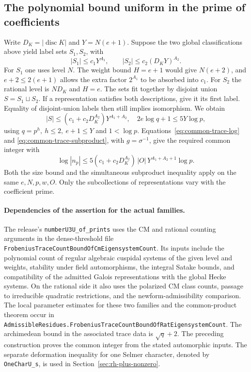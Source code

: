 \subsection{The polynomial bound uniform in the prime of coefficients}

Write \(D_K=|\operatorname{disc}K|\) and \(Y=N(e+1)\).
Suppose the two global classifications above yield label sets
\(S_1,S_2\), with
\[
             |S_1|\le c_1Y^{A_1},\qquad
             |S_2|\le c_2(D_KY)^{A_2}.
\]
For \(S_1\) one uses level \(N\). The weight bound \(H=e+1\)
would give \(N(e+2)\), and \(e+2\le2(e+1)\) allows the extra
factor \(2^{A_1}\) to be absorbed into \(c_1\).
For \(S_2\) the rational level is \(ND_K\) and \(H=e\).
The sets fit together by disjoint union \(S=S_1\sqcup S_2\).
If a representation satisfies both descriptions, give it its
first label. Equality of disjoint-union labels then still implies
isomorphism. We obtain
\[
 |S|\le(c_1+c_2D_K^{A_2})Y^{A_1+A_2},\quad
 2e\log q+1\le 5Y\log p ,
\]
using \(q=p^h,\ h\le2,\ e+1\le Y\) and \(1<\log p\).
Equations~\eqref{eq:common-trace-log} and
\eqref{eq:common-trace-subproduct}, with \(g=\sigma^{-1}\),
give the required common integer with
\[
 \log|n_p|\le 5(c_1+c_2D_K^{A_2})\,
                 |O|\,Y^{A_1+A_2+1}\log p .
\]
Both the size bound and the simultaneous subproduct inequality
apply on the same \(e,N,p,w,O\). Only the subcollections of
representations vary with the coefficient prime.

\paragraph{Dependencies of the assertion for the actual families.}
The release's \texttt{number\allowbreak{}U3\allowbreak{}U\_\allowbreak{}of\_\allowbreak{}prints} uses the CM
and rational counting arguments in the dense-threshold file
\texttt{Frobenius\allowbreak{}Trace\allowbreak{}Count\allowbreak{}Bound\allowbreak{}Of\allowbreak{}Cm\allowbreak{}Eigensystem\allowbreak{}Count}.
Its inputs include the polynomial count of regular algebraic
cuspidal systems of the given level and weights, stability under
field automorphisms, the integral Satake bounds, and compatibility
of the admitted Galois representations with the global Hecke
systems. On the rational side it also uses the polarized CM
class counts, passage to irreducible quadratic restrictions, and
the newform-admissibility comparison. The local parameter estimates
for these two families and the common-product theorem occur in
\texttt{Admissible\allowbreak{}Residues.\allowbreak{}Frobenius\allowbreak{}Trace\allowbreak{}Count\allowbreak{}Bound\allowbreak{}Of\allowbreak{}Rat\allowbreak{}Eigensystem\allowbreak{}Count}.
The archimedean bound in the associated trace data is
\(\sqrt q+2\). The preceding construction proves the common integer
from the stated automorphic inputs. The separate deformation
inequality for one Selmer character, denoted by
\texttt{One\allowbreak{}Char\allowbreak{}U\_\allowbreak{}s}, is used in Section~\ref{sec:rh-plus-nonzero}.
